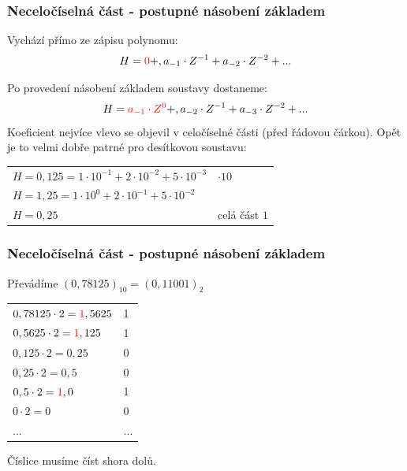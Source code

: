   \begin{frame}
    \frametitle{Neceločíselná část - postupné násobení základem}
		
		Vychází přímo ze zápisu polynomu:
      \small
			\boldmath
			\begin{align*}
			H =\textcolor{red}{0} +, a_{-1} \cdot Z^{-1} + a_{-2} \cdot Z^{-2} + ...
			\end{align*}
		
		Po provedení násobení základem soustavy dostaneme:
      \small
			\boldmath
			\begin{align*}
			H =\textcolor{red}{a_{-1} \cdot Z^{0}} +, a_{-2} \cdot Z^{-1} + a_{-3} \cdot Z^{-2} + ...
			\end{align*}
      \normalsize
    Koeficient nejvíce vlevo se objevil v celočíselné části (před řádovou čárkou). Opět je to velmi dobře patrné pro desítkovou soustavu:
      \small
    	\begin{center}
        \begin{tabular}{p{70mm} | p{20mm}}
        $H = 0,125 = 1 \cdot 10^{-1} + 2 \cdot 10^{-2} + 5 \cdot 10^{-3}$ & $\cdot 10$ \\
        $H = 1,25 = 1 \cdot 10^0 + 2 \cdot 10^{-1} + 5 \cdot 10^{-2}$ & \\
        $H = 0,25$ & celá část $1$
        \end{tabular}
      \end{center}
	\end{frame}
  
  \begin{frame}
    \frametitle{Neceločíselná část - postupné násobení základem}
    \boldmath
    Převádíme $(0,78125)_{10}=(0,11001)_{2}$

		\begin{center}
      \begin{tabular}{p{60mm} | p{15mm}}
        $0,78125 \cdot 2 = \textcolor{red}{1},5625$ & 1 \\
        $0,5625 \cdot 2 = \textcolor{red}{1},125$ & 1 \\
        $0,125 \cdot 2 = 0,25$ & 0 \\
        $0,25 \cdot 2 = 0,5$ & 0 \\
        $0,5 \cdot 2 = \textcolor{red}{1},0$ & 1 \\
        $0 \cdot 2 = 0$ & 0 \\
        ... & ... \\
      \end{tabular}
    \end{center}
    Číslice musíme číst shora dolů.
	\end{frame}

